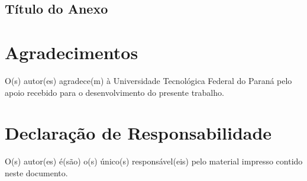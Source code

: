 \documentclass[%
  report,%
  10pt,%
  a4paper,%
  fleqn,%
  oneside,%
  sumario = tradicional,%
  chapter = TITLE,%
  section = TITLE,%
]{abntex2}
\begin{document}
\begin{ambienteanexos}%

\chapter{Título do Anexo}\label{cap:anexoa}

\lipsum[21-25]

\end{ambienteanexos}

\chapter*{Agradecimentos}

O(s) autor(es) agradece(m) à Universidade Tecnológica Federal do Paraná pelo apoio recebido para o desenvolvimento do presente trabalho.

\chapter*{Declaração de Responsabilidade}

O(s) autor(es) é(são) o(s) único(s) responsável(eis) pelo material impresso contido neste documento.

\end{document}
